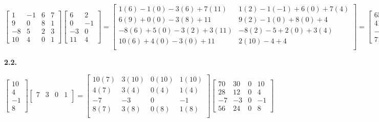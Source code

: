 \documentclass[12pt]{article}
\begin{document}
\begin{center}

$
\begin{bmatrix}
1 & -1 & 6 & 7\\
9 & 0 & 8 & 1\\
-8 & 5 & 2 & 3\\
10 & 4 & 0 & 1
\end{bmatrix}
\begin{bmatrix}
6 & 2\\
0 & -1\\
-3 & 0\\
11 & 4
\end{bmatrix}=
\begin{bmatrix}
1(6)-1(0)-3(6)+7(11) & 1(2)-1(-1)+6(0)+7(4)\\
6(9)+0(0)-3(8)+11 & 9(2)-1(0)+8(0)+4\\
-8(6)+5(0)-3(2)+3(11) & -8(2)-5+2(0)+3(4)\\
10(6)+4(0)-3(0)+11 & 2(10)-4+4\\
\end{bmatrix}=
\begin{bmatrix}
65 & 31\\
41 & 22\\
-21 & -9\\
71 & 20
\end{bmatrix}
$\\

\end{center}

{\bf 2.2.} 
\begin{center}
$
\begin{bmatrix}
10\\
4\\
-1\\
8
\end{bmatrix}
\begin{bmatrix}
7 & 3 & 0 & 1\\
\end{bmatrix}=
\begin{bmatrix}
10(7) & 3(10) & 0(10) & 1(10)\\
4(7) & 3(4) & 0(4) & 1(4)\\
-7 & -3 & 0 & -1\\
8(7) & 3(8) & 0(8) & 1(8)\\
\end{bmatrix}
\begin{bmatrix}
70 & 30 & 0 & 10\\
28 & 12 & 0 & 4\\
-7 & -3 & 0 & -1\\
56 & 24 & 0 & 8
\end{bmatrix}
$

\end{center}
\end{document}
